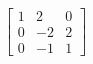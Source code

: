 \begin{displaymath}
 \begin{bmatrix}
  1 & 2 & 0 \\
  0 & -2 & 2 \\
  0 & -1 & 1 
 \end{bmatrix}
\end{displaymath}

